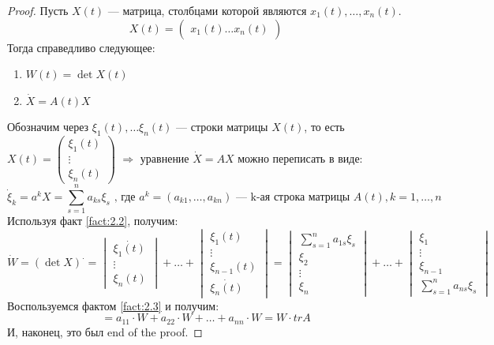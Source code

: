 \documentclass[11pt]{article}
\begin{document}
\begin{proof}
    Пусть $X(t)$ --- матрица, столбцами которой являются $x_1(t), \ldots, x_n(t)$. 
    \[ X(t) = \begin{pmatrix}
        x_1(t) \ldots x_n(t)
    \end{pmatrix} \]
    Тогда справедливо следующее:
    \begin{enumerate}
        \item $ W(t) = \det X(t)$
        \item $\dot{X} = A(t)X$
    \end{enumerate}
    Обозначим через $\xi_1(t), \ldots \xi_n(t) $ --- строки матрицы $X(t)$, то есть $ X(t) = \begin{pmatrix}
        \xi_1(t)\\
        \vdots\\
        \xi_n(t)
    \end{pmatrix}$
    $\Rightarrow$ уравнение $\dot{X} = AX$ можно переписать в виде:
    \[ \dot{\xi}_k = a^k X = \sum_{s=1}^{n} a_{ks} \xi_s \text{ , где } a^k= (a_{k1}, \ldots, a_{kn}) \text{ --- k-ая строка матрицы } A(t), k=1,\ldots, n\] 
    Используя факт \ref{fact:2.2}, получим:
    \[ \dot{W} = (\det X)^{\boldsymbol{\cdot}} =\begin{vmatrix}
        \dot{\xi_1(t)} \\
        \vdots \\
        {\xi_n(t)}
    \end{vmatrix}
    + \ldots + \begin{vmatrix}
        \xi_1(t)\\
        \vdots\\
        \xi_{n-1}(t)\\
        \dot{\xi_n(t)}
    \end{vmatrix} =
    \begin{vmatrix} \displaystyle
        \sum_{s=1}^{n} a_{1s}\xi_s\\
        \xi_2\\
        \vdots\\
        \xi_n
    \end{vmatrix} +\ldots + 
    \begin{vmatrix} 
        \xi_1\\
        \vdots\\
        \xi_{n-1}\\
        \displaystyle \sum_{s=1}^{n} a_{ns}\xi_s
    \end{vmatrix} \]    
    Воспользуемся фактом \ref{fact:2.3} и получим:
    \[ = a_{11}\cdot W + a_{22}\cdot W + \ldots + a_{nn}\cdot W = W\cdot trA  \]
    И, наконец, это был end of the proof. 
\end{proof}
\end{document}
